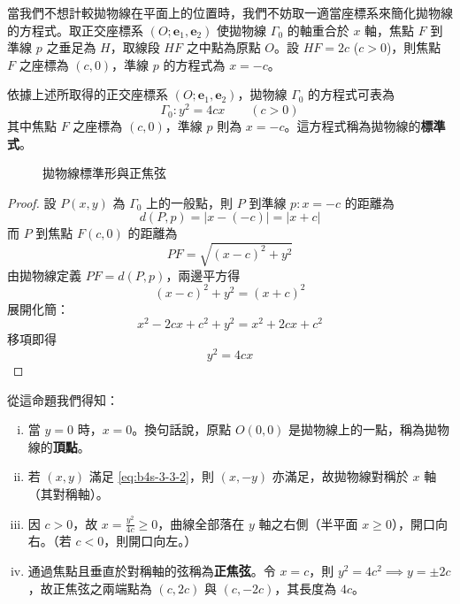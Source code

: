 當我們不想計較拋物線在平面上的位置時，我們不妨取一適當座標系來簡化拋物線的方程式。取正交座標系 $(O; \mathbf{e}_1, \mathbf{e}_2)$ 使拋物線 $\Gamma_0$ 的軸重合於 $x$ 軸，焦點 $F$ 到準線 $p$ 之垂足為 $H$，取線段 $HF$ 之中點為原點 $O$。設 $HF = 2c$ ($c > 0$)，則焦點 $F$ 之座標為 $(c,0)$，準線 $p$ 的方程式為 $x = -c$。

\begin{proposition}
依據上述所取得的正交座標系 $(O; \mathbf{e}_1, \mathbf{e}_2)$，拋物線 $\Gamma_0$ 的方程式可表為
\begin{equation}
\Gamma_0 : y^2 = 4cx \qquad (c > 0) \label{eq:b4s-3-3-2}
\end{equation}
其中焦點 $F$ 之座標為 $(c,0)$，準線 $p$ 則為 $x = -c$。這方程式稱為拋物線的\textbf{標準式}。
\end{proposition}

\begin{figure}[htbp]
\centering
{}
\caption{拋物線標準形與正焦弦}
\label{fig:b4s-3-19}
\end{figure}

\begin{proof}
設 $P(x,y)$ 為 $\Gamma_0$ 上的一般點，則 $P$ 到準線 $p: x = -c$ 的距離為
\[ d(P, p) = |x - (-c)| = |x + c| \]
而 $P$ 到焦點 $F(c,0)$ 的距離為
\[ PF = \sqrt{(x-c)^2 + y^2} \]
由拋物線定義 $PF = d(P, p)$，兩邊平方得
\[ (x-c)^2 + y^2 = (x+c)^2 \]
展開化簡：
\[ x^2 - 2cx + c^2 + y^2 = x^2 + 2cx + c^2 \]
移項即得
\[ y^2 = 4cx \]
\end{proof}

從這命題我們得知：
\begin{enumerate}[(i)]
  \item 當 $y=0$ 時，$x=0$。換句話說，原點 $O(0,0)$ 是拋物線上的一點，稱為拋物線的\textbf{頂點}。
  \item 若 $(x,y)$ 滿足 \eqref{eq:b4s-3-3-2}，則 $(x,-y)$ 亦滿足，故拋物線對稱於 $x$ 軸（其對稱軸）。
  \item 因 $c > 0$，故 $x = \frac{y^2}{4c} \ge 0$，曲線全部落在 $y$ 軸之右側（半平面 $x \ge 0$），開口向右。（若 $c < 0$，則開口向左。）
  \item 通過焦點且垂直於對稱軸的弦稱為\textbf{正焦弦}。令 $x=c$，則 $y^2 = 4c^2 \implies y = \pm 2c$，故正焦弦之兩端點為 $(c, 2c)$ 與 $(c, -2c)$，其長度為 $4c$。
\end{enumerate}

